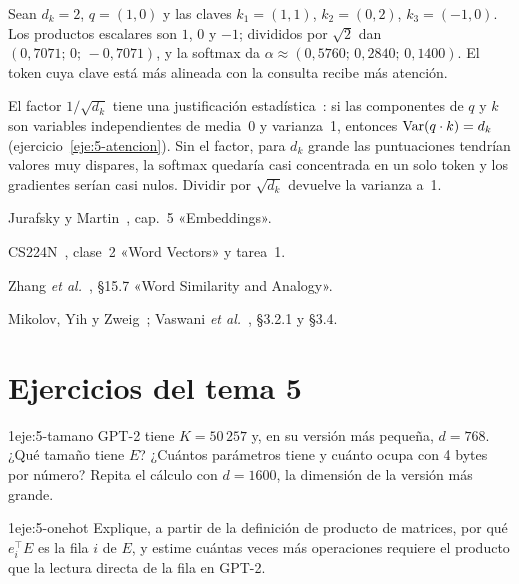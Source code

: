 \begin{ejemplo}\label{ej:atencion}
Sean $d_k=2$, $q=(1,0)$ y las claves $k_1=(1,1)$, $k_2=(0,2)$, $k_3=(-1,0)$. Los productos escalares son $1$, $0$ y $-1$; divididos por $\sqrt2$ dan $(0{,}7071;\,0;\,-0{,}7071)$, y la softmax da $\alpha\approx(0{,}5760;\,0{,}2840;\,0{,}1400)$. El token cuya clave está más alineada con la consulta recibe más atención.
\end{ejemplo}

El factor $1/\sqrt{d_k}$ tiene una justificación estadística~\cite[§3.2.1]{vaswani}: si las componentes de $q$ y $k$ son variables independientes de media~0 y varianza~1, entonces $\operatorname{Var}(q\cdot k)=d_k$ (ejercicio~\ref{eje:5-atencion}). Sin el factor, para $d_k$ grande las puntuaciones tendrían valores muy dispares, la softmax quedaría casi concentrada en un solo token y los gradientes serían casi nulos. Dividir por $\sqrt{d_k}$ devuelve la varianza a~1.

\begin{lecturas}
\item Jurafsky y Martin~\cite{jm3}, cap.~5 «Embeddings».
\item CS224N~\cite{cs224n}, clase~2 «Word Vectors» y tarea~1.
\item Zhang \emph{et al.}~\cite{d2l}, §15.7 «Word Similarity and Analogy».
\item Mikolov, Yih y Zweig~\cite{mikolov-b}; Vaswani \emph{et al.}~\cite{vaswani}, §3.2.1 y §3.4.
\end{lecturas}

\section*{Ejercicios del tema 5}

\begin{ejercicio}{1}{eje:5-tamano}
GPT-2 tiene $K=50\,257$ y, en su versión más pequeña, $d=768$. ¿Qué tamaño tiene $E$? ¿Cuántos parámetros tiene y cuánto ocupa con 4 bytes por número? Repita el cálculo con $d=1600$, la dimensión de la versión más grande.
\end{ejercicio}

\begin{ejercicio}{1}{eje:5-onehot}
Explique, a partir de la definición de producto de matrices, por qué $e_i^{\top}E$ es la fila $i$ de $E$, y estime cuántas veces más operaciones requiere el producto que la lectura directa de la fila en GPT-2.
\end{ejercicio}

